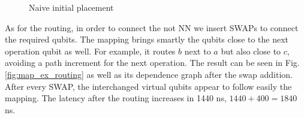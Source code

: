 \begin{figure}[H]
\centering
{}
\label{fig:map_ex_circ_wrong}

\label{fig:map_ex_chip_wrong}

\label{fig:map_ex_wrong_init}
\caption{Naive initial placement}
\end{figure}
As for the routing, in order to connect the not NN we insert SWAPs to connect the required qubits.
The mapping brings smartly the qubits close to the next operation qubit as well.
For example, it routes \(b\) next to \(a\) but also close to \(c\), avoiding a path increment for the next operation.
The result can be seen in Fig. \ref{fig:map_ex_routing} as well as its dependence graph after the swap addition.
After every SWAP, the interchanged virtual qubits appear to follow easily the mapping.
The latency after the routing increases in 1440 ns, \(1440 + 400 = 1840\) ns.


